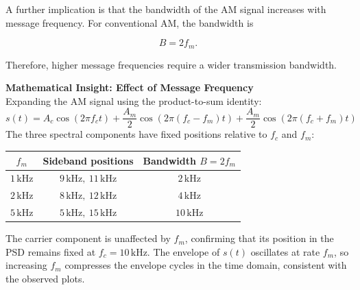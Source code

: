 \documentclass[../../main.tex]{subfiles}
\begin{document}
A further implication is that the bandwidth of the AM signal increases with message frequency. For conventional AM, the bandwidth is

\[
B = 2f_m.
\]

Therefore, higher message frequencies require a wider transmission bandwidth.



\begin{mdframed}[linewidth=1pt]
\textbf{Mathematical Insight: Effect of Message Frequency}\\[6pt]
Expanding the AM signal using the product-to-sum identity:
\[
s(t) = A_c\cos(2\pi f_c t) + \frac{A_m}{2}\cos(2\pi(f_c - f_m)t) + \frac{A_m}{2}\cos(2\pi(f_c + f_m)t)
\]
The three spectral components have fixed positions relative to $f_c$ and $f_m$:
\begin{center}
\begin{tabular}{ccc}
\hline
$f_m$ & Sideband positions & Bandwidth $B = 2f_m$ \\
\hline
$1\,\text{kHz}$ & $9\,\text{kHz},\ 11\,\text{kHz}$ & $2\,\text{kHz}$ \\
$2\,\text{kHz}$ & $8\,\text{kHz},\ 12\,\text{kHz}$ & $4\,\text{kHz}$ \\
$5\,\text{kHz}$ & $5\,\text{kHz},\ 15\,\text{kHz}$ & $10\,\text{kHz}$ \\
\hline
\end{tabular}
\end{center}
The carrier component is unaffected by $f_m$, confirming that its position 
in the PSD remains fixed at $f_c = 10\,\text{kHz}$. The envelope of $s(t)$ 
oscillates at rate $f_m$, so increasing $f_m$ compresses the envelope 
cycles in the time domain, consistent with the observed plots.
\end{mdframed}
\end{document}
